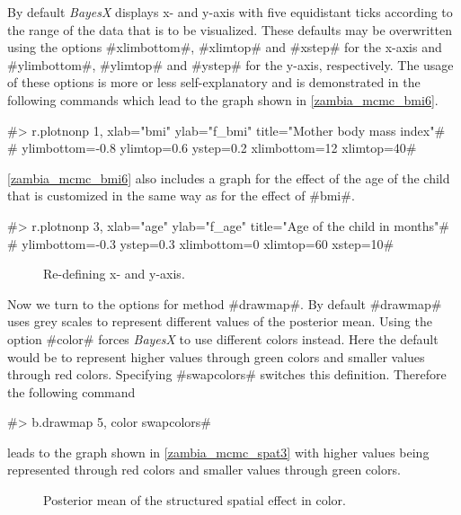 By default {\it BayesX} displays x- and y-axis with five
equidistant ticks according to the range of the data that is to be
visualized. These defaults may be overwritten using the options
#xlimbottom#, #xlimtop# and #xstep# for the x-axis and
#ylimbottom#, #ylimtop# and #ystep# for the y-axis, respectively.
The usage of these options is more or less self-explanatory and is
demonstrated in the following commands which lead to the graph
shown in \autoref{zambia_mcmc_bmi6}.

#> r.plotnonp 1, xlab="bmi" ylab="f_bmi" title="Mother body mass index"#\\
#  ylimbottom=-0.8 ylimtop=0.6 ystep=0.2 xlimbottom=12 xlimtop=40#

\autoref{zambia_mcmc_bmi6} also includes a graph for the effect of
the age of the child that is customized in the same way as for the
effect of #bmi#.

#> r.plotnonp 3, xlab="age" ylab="f_age" title="Age of the child in months"#\\
#  ylimbottom=-0.3  ystep=0.3 xlimbottom=0 xlimtop=60 xstep=10#

\begin{figure}[ht]
\begin{center}
{\it\caption{Re-defining x- and y-axis.\label{zambia_mcmc_bmi6}}}
\end{center}
\end{figure}

Now we turn to the options for method #drawmap#. By default
#drawmap# uses grey scales to represent different values of the
posterior mean. Using the option #color# forces {\it BayesX} to
use different colors instead. Here the default would be to
represent higher values through green colors and smaller values
through red colors. Specifying #swapcolors# switches this
definition. Therefore the following command

#> b.drawmap 5, color swapcolors#

leads to the graph shown in \autoref{zambia_mcmc_spat3} with
higher values being represented through red colors and smaller
values through green colors.

\begin{figure}[ht]
\begin{center}
{\it\caption{Posterior mean of the structured spatial effect in
color.\label{zambia_mcmc_spat3}}}
\end{center}
\end{figure}

